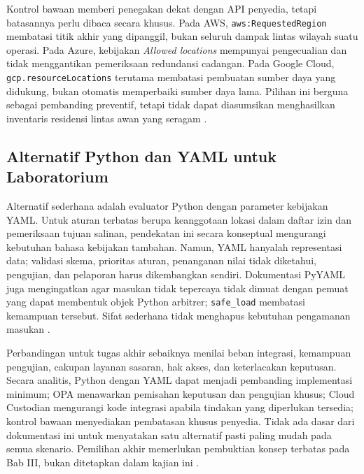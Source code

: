 Kontrol bawaan memberi penegakan dekat dengan API penyedia, tetapi batasannya perlu dibaca secara khusus. Pada AWS, \texttt{aws:RequestedRegion} membatasi titik akhir yang dipanggil, bukan seluruh dampak lintas wilayah suatu operasi. Pada Azure, kebijakan \textit{Allowed locations} mempunyai pengecualian dan tidak menggantikan pemeriksaan redundansi cadangan. Pada Google Cloud, \texttt{gcp.resourceLocations} terutama membatasi pembuatan sumber daya yang didukung, bukan otomatis memperbaiki sumber daya lama. Pilihan ini berguna sebagai pembanding preventif, tetapi tidak dapat diasumsikan menghasilkan inventaris residensi lintas awan yang seragam \autocite{b2c_awsRegionCondition,b2c_azurePolicyLocations,b2c_gcpLocationConstraint}.

\subsection{Alternatif Python dan YAML untuk Laboratorium}

Alternatif sederhana adalah evaluator Python dengan parameter kebijakan YAML. Untuk aturan terbatas berupa keanggotaan lokasi dalam daftar izin dan pemeriksaan tujuan salinan, pendekatan ini secara konseptual mengurangi kebutuhan bahasa kebijakan tambahan. Namun, YAML hanyalah representasi data; validasi skema, prioritas aturan, penanganan nilai tidak diketahui, pengujian, dan pelaporan harus dikembangkan sendiri. Dokumentasi PyYAML juga mengingatkan agar masukan tidak tepercaya tidak dimuat dengan pemuat yang dapat membentuk objek Python arbitrer; \texttt{safe\_load} membatasi kemampuan tersebut. Sifat sederhana tidak menghapus kebutuhan pengamanan masukan \autocite{b2c_pyyamlDocs}.

Perbandingan untuk tugas akhir sebaiknya menilai beban integrasi, kemampuan pengujian, cakupan layanan sasaran, hak akses, dan keterlacakan keputusan. Secara analitis, Python dengan YAML dapat menjadi pembanding implementasi minimum; OPA menawarkan pemisahan keputusan dan pengujian khusus; Cloud Custodian mengurangi kode integrasi apabila tindakan yang diperlukan tersedia; kontrol bawaan menyediakan pembatasan khusus penyedia. Tidak ada dasar dari dokumentasi ini untuk menyatakan satu alternatif pasti paling mudah pada semua skenario. Pemilihan akhir memerlukan pembuktian konsep terbatas pada Bab III, bukan ditetapkan dalam kajian ini \autocite{b2c_opaOverview,b2c_opaTesting,b2c_custodianOverview}.

